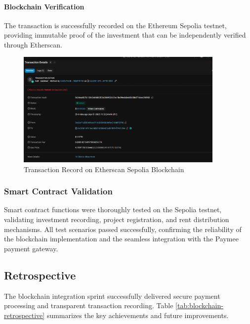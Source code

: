 \paragraph{Blockchain Verification}
The transaction is successfully recorded on the Ethereum Sepolia testnet, providing immutable proof of the investment that can be independently verified through Etherscan.

\begin{figure}[htbp]
    \centering
    \includegraphics[width=0.9\textwidth]{images/etherscan_blockchain_record.png}
    \caption{Transaction Record on Etherscan Sepolia Blockchain}
    \label{fig:etherscan-blockchain-record}
\end{figure}

\subsubsection{Smart Contract Validation}
Smart contract functions were thoroughly tested on the Sepolia testnet, validating investment recording, project registration, and rent distribution mechanisms. All test scenarios passed successfully, confirming the reliability of the blockchain implementation and the seamless integration with the Paymee payment gateway.
\newpage
\subsection{Retrospective}

The blockchain integration sprint successfully delivered secure payment processing and transparent transaction recording. Table \ref{tab:blockchain-retrospective} summarizes the key achievements and future improvements.

